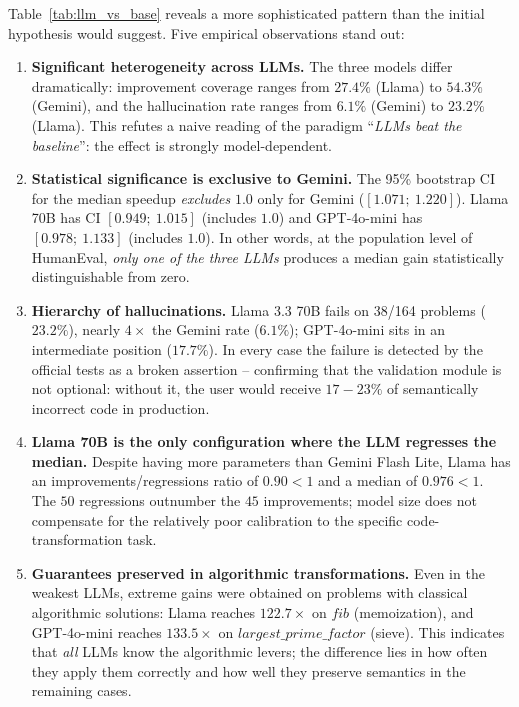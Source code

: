 \documentclass[conference]{IEEEtran}
\begin{document}
Table~\ref{tab:llm_vs_base} reveals a more sophisticated pattern than the initial hypothesis would suggest. Five empirical observations stand out:

\begin{enumerate}
  \item \textbf{Significant heterogeneity across LLMs.} The three models differ dramatically: improvement coverage ranges from $27.4\%$ (Llama) to $54.3\%$ (Gemini), and the hallucination rate ranges from $6.1\%$ (Gemini) to $23.2\%$ (Llama). This refutes a naive reading of the paradigm ``\textit{LLMs beat the baseline}'': the effect is strongly model-dependent.

  \item \textbf{Statistical significance is exclusive to Gemini.} The 95\% bootstrap CI for the median speedup \emph{excludes} $1.0$ only for Gemini ($[1.071;~1.220]$). Llama 70B has CI $[0.949;~1.015]$ (includes $1.0$) and GPT-4o-mini has $[0.978;~1.133]$ (includes $1.0$). In other words, at the population level of HumanEval, \emph{only one of the three LLMs} produces a median gain statistically distinguishable from zero.

  \item \textbf{Hierarchy of hallucinations.} Llama 3.3 70B fails on 38/164 problems ($23.2\%$), nearly $4\times$ the Gemini rate ($6.1\%$); GPT-4o-mini sits in an intermediate position ($17.7\%$). In every case the failure is detected by the official tests as a broken assertion -- confirming that the validation module is not optional: without it, the user would receive $17{-}23\%$ of semantically incorrect code in production.

  \item \textbf{Llama 70B is the only configuration where the LLM regresses the median.} Despite having more parameters than Gemini Flash Lite, Llama has an improvements/regressions ratio of $0.90 < 1$ and a median of $0.976 < 1$. The $50$ regressions outnumber the $45$ improvements; model size does not compensate for the relatively poor calibration to the specific code-transformation task.

  \item \textbf{Guarantees preserved in algorithmic transformations.} Even in the weakest LLMs, extreme gains were obtained on problems with classical algorithmic solutions: Llama reaches $122.7\times$ on $fib$ (memoization), and GPT-4o-mini reaches $133.5\times$ on $largest\_prime\_factor$ (sieve). This indicates that \emph{all} LLMs know the algorithmic levers; the difference lies in how often they apply them correctly and how well they preserve semantics in the remaining cases.
\end{enumerate}
\end{document}
